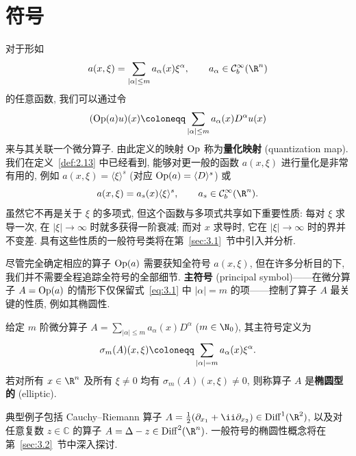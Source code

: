 
\chapter{符号}\label{ch:03}

对于形如
\begin{equation}\label{eq:3.1}
    a(x, \xi) = \sum_{|\alpha| \le m} a_\alpha(x) \xi^\alpha, \qquad a_\alpha \in \mathcal{C}_b^\infty(\R^n)
\end{equation}
的任意函数, 我们可以通过令
\begin{equation}\label{eq:3.2}
    (\Op(a) u)(x) \defeq \sum_{|\alpha| \le m} a_\alpha(x) D^\alpha u(x)
\end{equation}
来与其关联一个微分算子. 由此定义的映射 $\operatorname{Op}$ 称为\textbf{量化映射} (quantization map). 我们在定义~\ref{def:2.13} 中已经看到, 能够对更一般的函数 $a(x, \xi)$ 进行量化是非常有用的, 例如 $a(x, \xi) = \langle \xi \rangle^s$ (对应 $\operatorname{Op}(a) = \langle D \rangle^s$) 或
\begin{equation}\label{eq:3.3}
    a(x, \xi) = a_s(x) \langle \xi \rangle^s, \qquad a_s \in \mathcal{C}_b^\infty(\R^n).
\end{equation}
虽然它不再是关于 $\xi$ 的多项式, 但这个函数与多项式共享如下重要性质: 每对 $\xi$ 求导一次, 在 $|\xi| \to \infty$ 时就多获得一阶衰减; 而对 $x$ 求导时, 它在 $|\xi| \to \infty$ 时的界并不变差. 具有这些性质的一般符号类将在第~\ref{sec:3.1}~节中引入并分析.

尽管完全确定相应的算子 $\operatorname{Op}(a)$ 需要获知全符号 $a(x, \xi)$, 但在许多分析目的下, 我们并不需要全程追踪全符号的全部细节. \textbf{主符号} (principal symbol)——在微分算子 $A = \operatorname{Op}(a)$ 的情形下仅保留式~\eqref{eq:3.1} 中 $|\alpha| = m$ 的项——控制了算子 $A$ 最关键的性质, 例如其椭圆性.

\begin{definition}[微分算子的主符号]\label{def:3.1}
给定 $m$ 阶微分算子 $A = \sum_{|\alpha| \le m} a_\alpha(x) D^\alpha$ ($m \in \N_0$), 其主符号定义为
\begin{equation}\label{eq:3.4}
    \sigma_m(A)(x, \xi) \defeq \sum_{|\alpha| = m} a_\alpha(x) \xi^\alpha.
\end{equation}
若对所有 $x \in \R^n$ 及所有 $\xi \neq 0$ 均有 $\sigma_m(A)(x, \xi) \neq 0$, 则称算子 $A$ 是\textbf{椭圆型的} (elliptic).
\end{definition}

典型例子包括 Cauchy--Riemann 算子 $A = \frac{1}{2}(\partial_{x_1} + \ii \partial_{x_2}) \in \Diff^1(\R^2)$, 以及对任意复数 $z \in \mathbb{C}$ 的算子 $A = \Delta - z \in \Diff^2(\R^n)$. 一般符号的椭圆性概念将在第~\ref{sec:3.2}~节中深入探讨.

